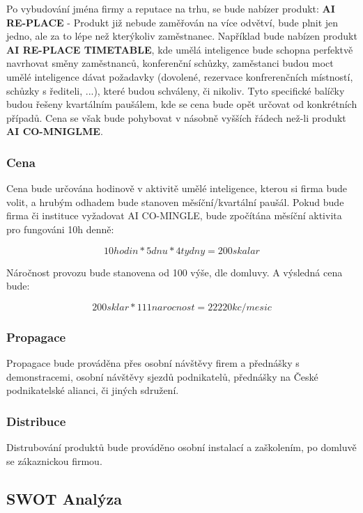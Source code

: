 \documentclass[a4paper,12pt]{report}
\begin{document}
Po vybudování jména firmy a reputace na trhu, se bude nabízer produkt: \textbf{AI RE-PLACE} - Produkt již nebude zaměřován
na více odvětví, bude plnit jen jedno, ale za to lépe než kterýkoliv zaměstnanec. Například bude nabízen produkt
\textbf{AI RE-PLACE TIMETABLE}, kde umělá inteligence bude schopna perfektvě navrhovat směny zaměstnanců, konferenční schůzky,
zaměstanci budou moct umělé inteligence dávat požadavky (dovolené, rezervace konfrerenčních místností, schůzky s řediteli, ...),
které budou schváleny, či nikoliv. Tyto specifické balíčky budou řešeny kvartálním paušálem, kde se cena bude opět určovat od
konkrétních případů. Cena se však bude pohybovat v násobně vyšších řádech než-li produkt \textbf{AI CO-MNIGLME}.

\subsubsection{Cena}

Cena bude určována hodinově v aktivitě umělé inteligence, kterou si firma bude volit, a hrubým odhadem bude stanoven měsíční/kvartální paušál.
Pokud bude firma či instituce vyžadovat AI CO-MINGLE, bude zpočítána měsíční aktivita pro fungováni 10h denně: 

    $$ 10hodin * 5dnu  * 4tydny = 200skalar$$

Náročnost provozu bude stanovena od 100 výše, dle domluvy. A výsledná cena bude:

    $$ 200sklar * 111 narocnost = 22220kc/mesic$$

\subsubsection{Propagace}

Propagace bude prováděna přes osobní návštěvy firem a přednášky s demonstracemi, osobní návštěvy sjezdů podnikatelů, přednášky na
České podnikatelské alianci, či jiných sdružení.

\subsubsection{Distribuce}

Distrubování produktů bude prováděno osobní instalací a zaškolením, po domluvě se zákaznickou firmou.

\newpage

\subsection{SWOT Analýza}
\end{document}

